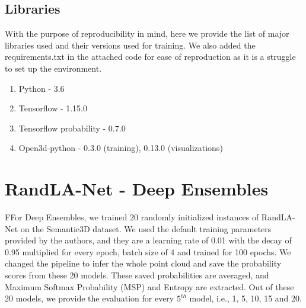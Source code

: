     \subsection*{Libraries}
    With the purpose of reproducibility in mind, here we provide the list of major libraries used and their versions used for training.
    We also added the requirements.txt in the attached code for ease of reproduction as it is a struggle to set up the environment.
    \begin{enumerate}
        \item Python - 3.6
        \item Tensorflow - 1.15.0
        \item Tensorflow probability - 0.7.0
        \item Open3d-python - 0.3.0 (training), 0.13.0 (visualizations)
    \end{enumerate}
    
    \section{RandLA-Net - Deep Ensembles}
    \label{sec:de_setup}
    FFor Deep Ensembles, we trained 20 randomly initialized instances of RandLA-Net on the Semantic3D dataset.
    We used the default training parameters provided by the authors, and they are a learning rate of 0.01 with the decay of 0.95 multiplied for every epoch, batch size of 4 and trained for 100 epochs.
    We changed the pipeline to infer the whole point cloud and save the probability scores from these 20 models.
    These saved probabilities are averaged, and Maximum Softmax Probability (MSP) and Entropy are extracted.
    Out of these 20 models, we provide the evaluation for every $5^{th}$ model, i.e., 1, 5, 10, 15 and 20.

